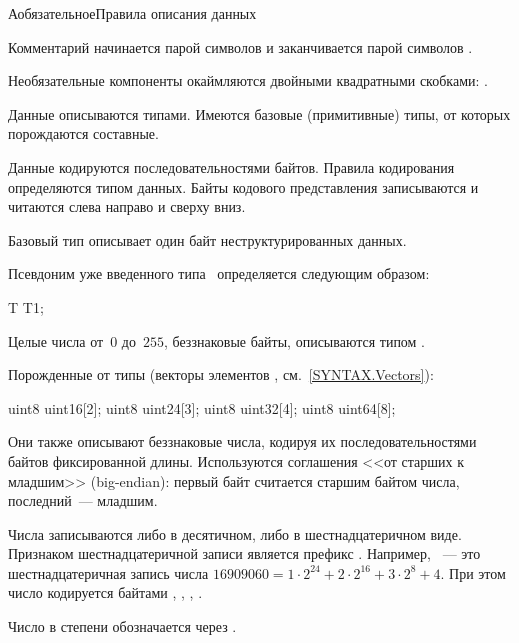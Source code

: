 \begin{appendix}{А}{обязательное}{Правила описания данных}\label{SYNTAX}

\label{SYNTAX.Common}

Комментарий начинается парой символов \code{/*} и заканчивается парой символов 
\code{*/}.

Необязательные компоненты окаймляются двойными квадратными скобками: 
\code{[[ ]]}.

Данные описываются типами. Имеются базовые (примитивные) типы, от которых 
порождаются составные.

Данные кодируются последовательностями байтов. Правила кодирования определяются 
типом данных. Байты кодового представления записываются и читаются слева 
направо и сверху вниз.

Базовый тип  описывает один байт неструктурированных данных.

Псевдоним  уже введенного типа~ определяется следующим 
образом:
%
\begin{codeblock}
T T1;
\end{codeblock}

\label{SYNTAX.Numbers}

Целые числа от~$0$ до~$255$, беззнаковые байты, описываются типом . 

Порожденные от  типы (векторы элементов , 
см.~\ref{SYNTAX.Vectors}):
%
\begin{codeblock}
uint8 uint16[2];
uint8 uint24[3];
uint8 uint32[4];
uint8 uint64[8];
\end{codeblock}

Они также описывают беззнаковые числа, кодируя их последовательностями 
байтов фиксированной длины. 
%
Используются соглашения <<от старших к младшим>> (big-endian): первый байт 
считается старшим байтом числа, последний~--- младшим.

Числа записываются либо в десятичном, либо в шестнадцатеричном виде.
Признаком шестнадцатеричной записи является префикс .
%
Например, ~--- это шестнадцатеричная запись числа 
$16909060=1\cdot 2^{24}+2\cdot 2^{16}+3\cdot 2^8+4$. При этом число 
кодируется байтами , , , .

Число  в степени  обозначается через .

\label{SYNTAX.Vectors}


\end{appendix}
